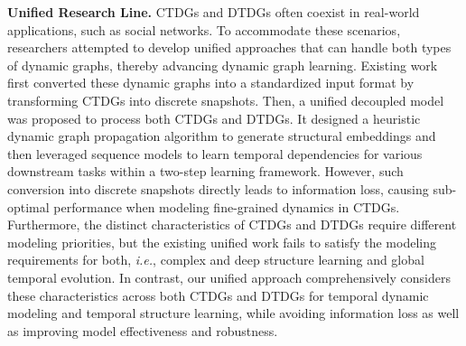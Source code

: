 








\noindent\textbf{Unified Research Line.} CTDGs and DTDGs often coexist in real-world applications, such as social networks. To accommodate these scenarios, researchers attempted to develop unified approaches that can handle both types of dynamic graphs, thereby advancing dynamic graph learning. Existing work first converted these dynamic graphs into a standardized input format by transforming CTDGs into discrete snapshots. Then, a unified decoupled model~\cite{DBLP:journals/pvldb/ZhengWL23} was proposed to process both CTDGs and DTDGs. It designed a heuristic dynamic graph propagation algorithm to generate structural embeddings and then leveraged sequence models to learn temporal dependencies for various downstream tasks within a two-step learning framework. However, such conversion into discrete snapshots directly leads to information loss, causing sub-optimal performance when modeling fine-grained dynamics in CTDGs. Furthermore, the distinct characteristics of CTDGs and DTDGs require different modeling priorities, but the existing unified work fails to satisfy the modeling requirements for both, \textit{i.e.}, complex and deep structure learning and global temporal evolution. In contrast, our unified approach comprehensively considers these characteristics across both CTDGs and DTDGs for temporal dynamic modeling and temporal structure learning, while avoiding information loss as well as improving model effectiveness and robustness.

